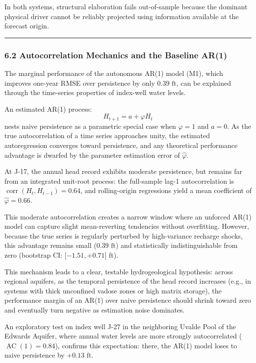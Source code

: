 \documentclass[11pt]{article}
\begin{document}
In both systems, structural elaboration fails out-of-sample because the
dominant physical driver cannot be reliably projected using information
available at the forecast origin.

\begin{center}\rule{0.5\linewidth}{0.5pt}\end{center}

\subsubsection{6.2 Autocorrelation Mechanics and the Baseline
AR(1)}\label{autocorrelation-mechanics-and-the-baseline-ar1}

The marginal performance of the autonomous AR(1) model (M1), which
improves one-year RMSE over persistence by only \(0.39\text{ ft}\), can
be explained through the time-series properties of index-well water
levels.

An estimated AR(1) process: \[H_{t+1} = a + \varphi H_t\] nests naive
persistence as a parametric special case when \(\varphi = 1\) and
\(a = 0\). As the true autocorrelation of a time series approaches
unity, the estimated autoregression converges toward persistence, and
any theoretical performance advantage is dwarfed by the parameter
estimation error of \(\hat{\varphi}\).

At J-17, the annual head record exhibits moderate persistence, but
remains far from an integrated unit-root process: the full-sample lag-1
autocorrelation is \(\operatorname{corr}(H_t, H_{t-1}) = 0.64\), and
rolling-origin regressions yield a mean coefficient of
\(\hat{\varphi} = 0.66\).

This moderate autocorrelation creates a narrow window where an unforced
AR(1) model can capture slight mean-reverting tendencies without
overfitting. However, because the true series is regularly perturbed by
high-variance recharge shocks, this advantage remains small
(\(0.39\text{ ft}\)) and statistically indistinguishable from zero
(bootstrap CI: {[}\(-1.51, +0.71\){]} ft).

This mechanism leads to a clear, testable hydrogeological hypothesis:
across regional aquifers, as the temporal persistence of the head record
increases (e.g., in systems with thick unconfined vadose zones or high
matrix storage), the performance margin of an AR(1) over naive
persistence should shrink toward zero and eventually turn negative as
estimation noise dominates.

An exploratory test on index well J-27 in the neighboring Uvalde Pool of
the Edwards Aquifer, where annual water levels are more strongly
autocorrelated (\(\operatorname{AC}(1) = 0.84\)), confirms this
expectation: there, the AR(1) model loses to naive persistence by
\(+0.13\text{ ft}\).
\end{document}
